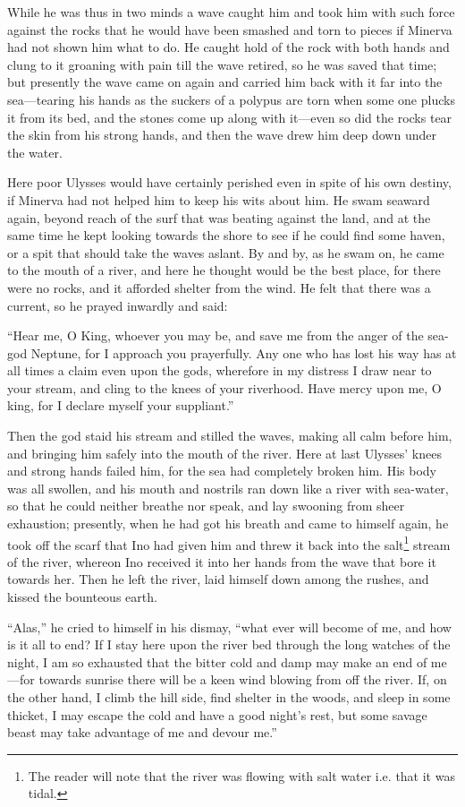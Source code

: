 While he was thus in two minds a wave caught him and took him with such force
against the rocks that he would have been smashed and torn to pieces if Minerva
had not shown him what to do. He caught hold of the rock with both hands and
clung to it groaning with pain till the wave retired, so he was saved that
time; but presently the wave came on again and carried him back with it far
into the sea—tearing his hands as the suckers of a polypus are torn when some
one plucks it from its bed, and the stones come up along with it—even so did
the rocks tear the skin from his strong hands, and then the wave drew him deep
down under the water.

Here poor Ulysses would have certainly perished even in spite of his own
destiny, if Minerva had not helped him to keep his wits about him. He swam
seaward again, beyond reach of the surf that was beating against the land, and
at the same time he kept looking towards the shore to see if he could find some
haven, or a spit that should take the waves aslant. By and by, as he swam on,
he came to the mouth of a river, and here he thought would be the best place,
for there were no rocks, and it afforded shelter from the wind. He felt that
there was a current, so he prayed inwardly and said:

“Hear me, O King, whoever you may be, and save me from the anger of the sea-god
Neptune, for I approach you prayerfully. Any one who has lost his way has at
all times a claim even upon the gods, wherefore in my distress I draw near to
your stream, and cling to the knees of your riverhood. Have mercy upon me, O
king, for I declare myself your suppliant.”

Then the god staid his stream and stilled the waves, making all calm before
him, and bringing him safely into the mouth of the river. Here at last Ulysses’
knees and strong hands failed him, for the sea had completely broken him. His
body was all swollen, and his mouth and nostrils ran down like a river with
sea-water, so that he could neither breathe nor speak, and lay swooning from
sheer exhaustion; presently, when he had got his breath and came to himself
again, he took off the scarf that Ino had given him and threw it back into the
salt\footnote{The reader will note that the river was flowing with salt water i.e. that it
was tidal.} stream of
the river, whereon Ino received it into her hands from the wave that bore it
towards her. Then he left the river, laid himself down among the rushes, and
kissed the bounteous earth.

“Alas,” he cried to himself in his dismay, “what ever will become of me, and
how is it all to end? If I stay here upon the river bed through the long
watches of the night, I am so exhausted that the bitter cold and damp may make
an end of me—for towards sunrise there will be a keen wind blowing from off the
river. If, on the other hand, I climb the hill side, find shelter in the woods,
and sleep in some thicket, I may escape the cold and have a good night’s rest,
but some savage beast may take advantage of me and devour me.”

